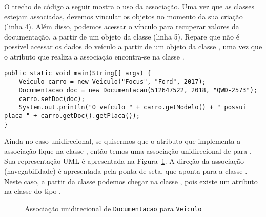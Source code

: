 O trecho de código a seguir mostra o uso da associação. Uma vez que as classes estejam associadas, devemos vincular os objetos no momento da sua criação (linha 4). Além disso, podemos acessar o vínculo para recuperar valores da documentação, a partir de um objeto da classe  (linha 5). Repare que não é possível acessar os dados do veículo a partir de um objeto da classe , uma vez que o atributo que realiza a associação encontra-se na classe .

\begin{verbatim}
public static void main(String[] args) { 
	Veiculo carro = new Veiculo("Focus", "Ford", 2017); 
	Documentacao doc = new Documentacao(512647522, 2018, "QWD-2573"); 
	carro.setDoc(doc);
	System.out.println("O veículo " + carro.getModelo() + " possui placa " + carro.getDoc().getPlaca()); 
}
\end{verbatim}

Ainda no caso unidirecional, se quisermos que o atributo que implementa a associação fique na classe , então temos uma associação unidirecional de  para . Sua representação UML é apresentada na Figura~\ref{fig:associacao-uni-documentacao}. A direção da associação (navegabilidade) é apresentada pela ponta de seta, que aponta para a classe . Neste caso, a partir da classe  podemos chegar na classe , pois existe um atributo na classe  do tipo .

\begin{figure}[h]
	\centering
	
	
	\caption{Associação unidirecional de \texttt{Documentacao} para \texttt{Veiculo}}
	\label{fig:associacao-uni-documentacao}
\end{figure}

